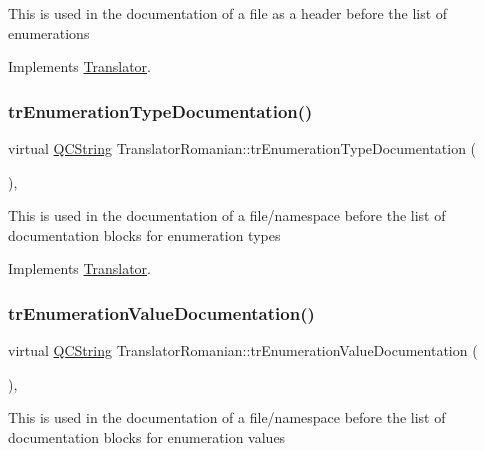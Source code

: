 This is used in the documentation of a file as a header before the list of enumerations 

Implements \mbox{\hyperlink{class_translator}{Translator}}.

\mbox{\label{class_translator_romanian_ab02b0d1967b75c2d349ab716dd113e64}} 
\subsubsection{\texorpdfstring{trEnumerationTypeDocumentation()}{trEnumerationTypeDocumentation()}}
{\footnotesize\ttfamily virtual \mbox{\hyperlink{class_q_c_string}{Q\+C\+String}} Translator\+Romanian\+::tr\+Enumeration\+Type\+Documentation (\begin{DoxyParamCaption}{ }\end{DoxyParamCaption})\hspace{0.3cm}{\ttfamily [inline]}, {\ttfamily [virtual]}}

This is used in the documentation of a file/namespace before the list of documentation blocks for enumeration types 

Implements \mbox{\hyperlink{class_translator}{Translator}}.

\mbox{\label{class_translator_romanian_ac01f36fb606f0020f36dde8de1a65d06}} 
\subsubsection{\texorpdfstring{trEnumerationValueDocumentation()}{trEnumerationValueDocumentation()}}
{\footnotesize\ttfamily virtual \mbox{\hyperlink{class_q_c_string}{Q\+C\+String}} Translator\+Romanian\+::tr\+Enumeration\+Value\+Documentation (\begin{DoxyParamCaption}{ }\end{DoxyParamCaption})\hspace{0.3cm}{\ttfamily [inline]}, {\ttfamily [virtual]}}

This is used in the documentation of a file/namespace before the list of documentation blocks for enumeration values 

